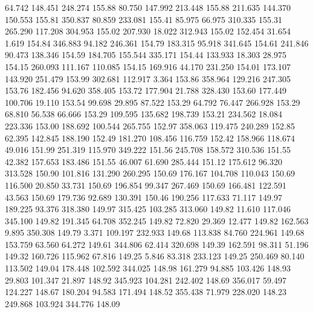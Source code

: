   64.742  148.451  248.274       155.88
  80.750  147.992  213.448       155.88
 211.635  144.370  150.553       155.81
 350.837   80.859  233.081       155.41
  85.975   66.975  310.335       155.31
 265.290  117.208  304.953       155.02
 207.930   18.022  312.943       155.02
 152.454   31.654    1.619       154.84
 346.883   94.182  246.361       154.79
 183.315   95.918  341.645       154.61
 241.846   90.473  138.346       154.59
 184.705  155.544  335.171       154.44
 133.933   18.303   28.975       154.15
 260.093  111.167  110.085       154.15
 169.916   44.170  231.250       154.01
 173.107  143.920  251.479       153.99
 302.681  112.917    3.364       153.86
 358.964  129.216  247.305       153.76
 182.456   94.620  358.405       153.72
 177.904   21.788  328.430       153.60
 177.449  100.706   19.110       153.54
  99.698   29.895   87.522       153.29
  64.792   76.447  266.928       153.29
  68.810   56.538   66.666       153.29
 109.595  135.682  198.739       153.21
 234.562   18.084  223.336       153.00
 188.692  100.544  265.755       152.97
 358.063  119.475  240.289       152.85
  62.395  142.845  188.190       152.49
 181.270  108.456  116.759       152.42
 158.966  118.674   49.016       151.99
 251.319  115.970  349.222       151.56
 245.708  158.572  310.536       151.55
  42.382  157.653  183.486       151.55
  46.007   61.690  285.444       151.12
 175.612   96.320  313.528       150.90
 101.816  131.290  260.295       150.69
 176.167  104.708  110.043       150.69
 116.500   20.850   33.731       150.69
 196.854   99.347  267.469       150.69
 166.481  122.591   43.563       150.69
 179.736   92.689  130.391       150.46
 190.256  117.633   71.117       149.97
 189.225   93.376  318.380       149.97
 315.425  103.285  313.060       149.82
  11.610  117.046  345.100       149.82
 191.345   64.708  352.245       149.82
  72.820   29.369   12.477       149.82
 162.563    9.895  350.308       149.79
   3.371  109.197  232.933       149.68
 113.838   84.760  224.961       149.68
 153.759   63.560   64.272       149.61
 344.806   62.414  320.698       149.39
 162.591   98.311   51.196       149.32
 160.726  115.962   67.816       149.25
   5.846   83.318  233.123       149.25
 250.469   80.140  113.502       149.04
 178.448  102.592  344.025       148.98
 161.279   94.885  103.426       148.93
  29.803  101.347   21.897       148.92
 345.923  104.281  242.402       148.69
 356.017   59.497  124.227       148.67
 180.204   94.583  171.494       148.52
 355.438   71.979  228.020       148.23
 249.868  103.924  344.776       148.09
